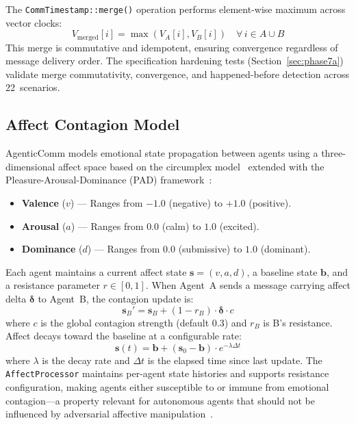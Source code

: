 \documentclass[10pt, twocolumn]{article}
\begin{document}
The \texttt{CommTimestamp::merge()} operation performs element-wise maximum across vector clocks:
\[
  V_{\text{merged}}[i] = \max(V_A[i], V_B[i]) \quad \forall\, i \in A \cup B
\]
This merge is commutative and idempotent, ensuring convergence regardless of message delivery order. The specification hardening tests (Section~\ref{sec:phase7a}) validate merge commutativity, convergence, and happened-before detection across 22~scenarios.


\subsection{Affect Contagion Model}
\label{sec:affect}

AgenticComm models emotional state propagation between agents using a three-dimensional affect space based on the circumplex model~\cite{russell1980circumplex} extended with the Pleasure-Arousal-Dominance (PAD) framework~\cite{mehrabian1996pleasure}:

\begin{itemize}[nosep, leftmargin=*]
  \item \textbf{Valence} ($v$) --- Ranges from $-1.0$ (negative) to $+1.0$ (positive).
  \item \textbf{Arousal} ($a$) --- Ranges from $0.0$ (calm) to $1.0$ (excited).
  \item \textbf{Dominance} ($d$) --- Ranges from $0.0$ (submissive) to $1.0$ (dominant).
\end{itemize}

Each agent maintains a current affect state $\mathbf{s} = (v, a, d)$, a baseline state $\mathbf{b}$, and a resistance parameter $r \in [0, 1]$. When Agent~A sends a message carrying affect delta $\boldsymbol{\delta}$ to Agent~B, the contagion update is:
\[
  \mathbf{s}_B' = \mathbf{s}_B + (1 - r_B) \cdot \boldsymbol{\delta} \cdot c
\]
where $c$ is the global contagion strength (default 0.3) and $r_B$ is B's resistance. Affect decays toward the baseline at a configurable rate:
\[
  \mathbf{s}(t) = \mathbf{b} + (\mathbf{s}_0 - \mathbf{b}) \cdot e^{-\lambda \Delta t}
\]
where $\lambda$ is the decay rate and $\Delta t$ is the elapsed time since last update. The \texttt{AffectProcessor} maintains per-agent state histories and supports resistance configuration, making agents either susceptible to or immune from emotional contagion---a property relevant for autonomous agents that should not be influenced by adversarial affective manipulation~\cite{hatfield1993emotional}.
\end{document}
